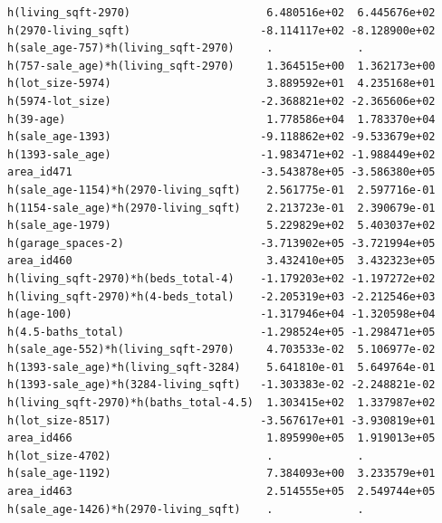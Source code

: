\documentclass[
]{article}
\begin{document}
\begin{verbatim}
h(living_sqft-2970)                     6.480516e+02  6.445676e+02
h(2970-living_sqft)                    -8.114117e+02 -8.128900e+02
h(sale_age-757)*h(living_sqft-2970)     .             .           
h(757-sale_age)*h(living_sqft-2970)     1.364515e+00  1.362173e+00
h(lot_size-5974)                        3.889592e+01  4.235168e+01
h(5974-lot_size)                       -2.368821e+02 -2.365606e+02
h(39-age)                               1.778586e+04  1.783370e+04
h(sale_age-1393)                       -9.118862e+02 -9.533679e+02
h(1393-sale_age)                       -1.983471e+02 -1.988449e+02
area_id471                             -3.543878e+05 -3.586380e+05
h(sale_age-1154)*h(2970-living_sqft)    2.561775e-01  2.597716e-01
h(1154-sale_age)*h(2970-living_sqft)    2.213723e-01  2.390679e-01
h(sale_age-1979)                        5.229829e+02  5.403037e+02
h(garage_spaces-2)                     -3.713902e+05 -3.721994e+05
area_id460                              3.432410e+05  3.432323e+05
h(living_sqft-2970)*h(beds_total-4)    -1.179203e+02 -1.197272e+02
h(living_sqft-2970)*h(4-beds_total)    -2.205319e+03 -2.212546e+03
h(age-100)                             -1.317946e+04 -1.320598e+04
h(4.5-baths_total)                     -1.298524e+05 -1.298471e+05
h(sale_age-552)*h(living_sqft-2970)     4.703533e-02  5.106977e-02
h(1393-sale_age)*h(living_sqft-3284)    5.641810e-01  5.649764e-01
h(1393-sale_age)*h(3284-living_sqft)   -1.303383e-02 -2.248821e-02
h(living_sqft-2970)*h(baths_total-4.5)  1.303415e+02  1.337987e+02
h(lot_size-8517)                       -3.567617e+01 -3.930819e+01
area_id466                              1.895990e+05  1.919013e+05
h(lot_size-4702)                        .             .           
h(sale_age-1192)                        7.384093e+00  3.233579e+01
area_id463                              2.514555e+05  2.549744e+05
h(sale_age-1426)*h(2970-living_sqft)    .             .           
                                                                  

\end{verbatim}
\end{document}
